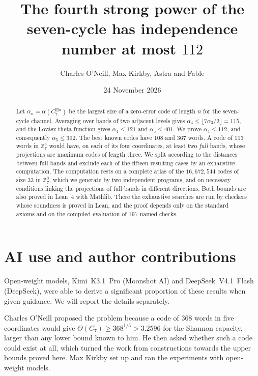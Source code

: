 \documentclass[11pt,colorlinks]{charlie}
\title{The fourth strong power of the seven-cycle has independence number at most $112$}
\author{Charles O'Neill, Max Kirkby, Astra and Fable}
\date{24 November 2026}
\newcommand{\spow}{\boxtimes}
\newcommand{\Zs}{\mathbb{Z}_7}
\begin{document}
\maketitle

\begin{abstract}
Let $\alpha_n=\alpha(C_7^{\spow n})$ be the largest size of a zero-error code of length $n$ for the seven-cycle channel. Averaging over bands of two adjacent levels gives $\alpha_4\le\lfloor7\alpha_3/2\rfloor=115$, and the Lov\'asz theta function gives $\alpha_4\le121$ and $\alpha_5\le401$. We prove $\alpha_4\le112$, and consequently $\alpha_5\le392$. The best known codes have $108$ and $367$ words. A code of $113$ words in $\Zs^4$ would have, on each of its four coordinates, at least two \emph{full} bands, whose projections are maximum codes of length three. We split according to the distances between full bands and exclude each of the fifteen resulting cases by an exhaustive computation. The computation rests on a complete atlas of the $16{,}672{,}544$ codes of size $33$ in $\Zs^3$, which we generate by two independent programs, and on necessary conditions linking the projections of full bands in different directions. Both bounds are also proved in Lean~4 with Mathlib. There the exhaustive searches are run by checkers whose soundness is proved in Lean, and the proof depends only on the standard axioms and on the compiled evaluation of $197$ named checks.
\end{abstract}

\section*{AI use and author contributions}
\aiusestatement

Open-weight models, Kimi~K3.1~Pro (Moonshot AI) and DeepSeek~V4.1~Flash (DeepSeek), were able to derive a significant proportion of these results when given guidance. We will report the details separately.

Charles O'Neill proposed the problem because a code of $368$ words in five coordinates would give $\Theta(C_7)\ge368^{1/5}>3.2596$ for the Shannon capacity, larger than any lower bound known to him. He then asked whether such a code could exist at all, which turned the work from constructions towards the upper bounds proved here. Max Kirkby set up and ran the experiments with open-weight models. \responsibilitystatement
\end{document}
